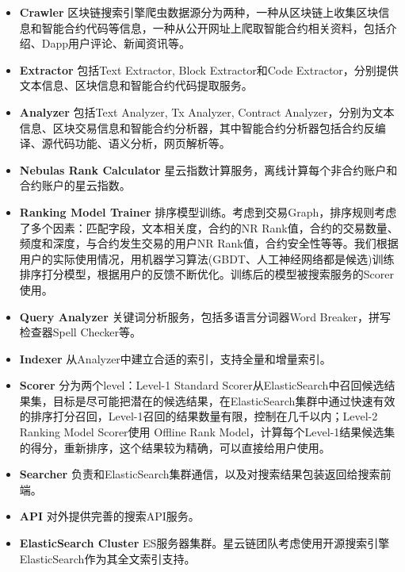 \begin{itemize}
	\item \textbf{Crawler} 区块链搜索引擎爬虫数据源分为两种，一种从区块链上收集区块信息和智能合约代码等信息，一种从公开网址上爬取智能合约相关资料，包括介绍、Dapp用户评论、新闻资讯等。
	\item \textbf{Extractor} 包括Text Extractor, Block Extractor和Code Extractor，分别提供文本信息、区块信息和智能合约代码提取服务。
	\item \textbf{Analyzer} 包括Text Analyzer, Tx Analyzer, Contract Analyzer，分别为文本信息、区块交易信息和智能合约分析器，其中智能合约分析器包括合约反编译、源代码功能、语义分析，网页解析等。
	\item \textbf{Nebulas Rank Calculator} 星云指数计算服务，离线计算每个非合约账户和合约账户的星云指数。
	\item \textbf{Ranking Model Trainer} 排序模型训练。考虑到交易Graph，排序规则考虑了多个因素：匹配字段，文本相关度，合约的NR Rank值，合约的交易数量、频度和深度，与合约发生交易的用户NR Rank值，合约安全性等等。我们根据用户的实际使用情况，用机器学习算法(GBDT、人工神经网络都是候选)训练排序打分模型，根据用户的反馈不断优化。训练后的模型被搜索服务的Scorer使用。
	\item \textbf{Query Analyzer} 关键词分析服务，包括多语言分词器Word Breaker，拼写检查器Spell Checker等。
	\item \textbf{Indexer} 从Analyzer中建立合适的索引，支持全量和增量索引。
	\item \textbf{Scorer} 分为两个level：Level-1 Standard Scorer从ElasticSearch中召回候选结果集，目标是尽可能把潜在的候选结果，在ElasticSearch集群中通过快速有效的排序打分召回，Level-1召回的结果数量有限，控制在几千以内；Level-2 Ranking Model Scorer使用 Offline Rank Model，计算每个Level-1结果候选集的得分，重新排序，这个结果较为精确，可以直接给用户使用。
	\item \textbf{Searcher} 负责和ElasticSearch集群通信，以及对搜索结果包装返回给搜索前端。
	\item \textbf{API} 对外提供完善的搜索API服务。
	\item \textbf{ElasticSearch Cluster} ES服务器集群。星云链团队考虑使用开源搜索引擎ElasticSearch作为其全文索引支持。
\end{itemize}

